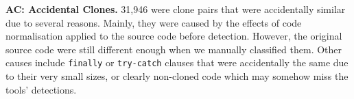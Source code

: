 \documentclass[sigconf,review, anonymous]{acmart}
\begin{document}
\textbf{AC: Accidental Clones.} 31,946 were clone pairs that were accidentally similar due to several reasons. Mainly, they were caused by the effects of code normalisation applied to the source code before detection. However, the original source code were still different enough when we manually classified them. Other causes include {\small\texttt{finally}} or {\small\texttt{try-catch}} clauses that were accidentally the same due to their very small sizes, or clearly non-cloned code which may somehow miss the tools' detections.


\end{document}
